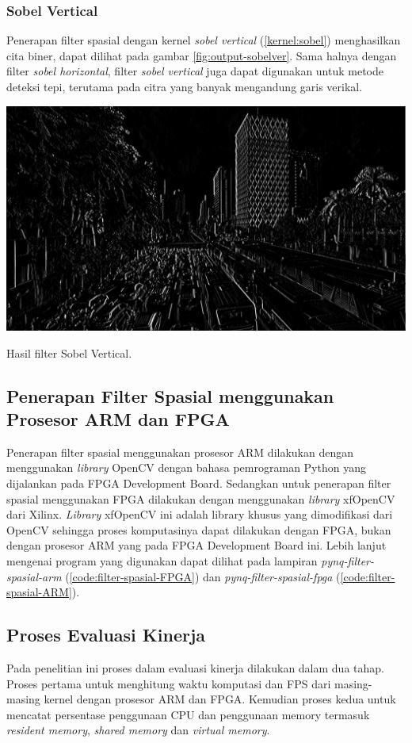 \subsubsection{Sobel Vertical}
Penerapan filter spasial dengan kernel \textit{sobel vertical} (\ref{kernel:sobel}) menghasilkan cita biner, dapat dilihat pada gambar \ref{fig:output-sobelver}. Sama halnya dengan filter \textit{sobel horizontal}, filter \textit{sobel vertical} juga dapat digunakan untuk metode deteksi tepi, terutama pada citra yang banyak mengandung garis verikal.
\begin{afigure}
    \includegraphics[width=0.8\linewidth, center]{images/output-image/input1-sobelver.png}
    \caption{Hasil filter Sobel Vertical.}
    \label{fig:output-sobelver}
\end{afigure}

\subsection{Penerapan Filter Spasial menggunakan Prosesor ARM dan FPGA}
Penerapan filter spasial menggunakan prosesor ARM dilakukan dengan menggunakan \textit{library} OpenCV dengan bahasa pemrograman Python yang dijalankan pada FPGA Development Board. Sedangkan untuk penerapan filter spasial menggunakan FPGA dilakukan dengan menggunakan \textit{library} xfOpenCV dari Xilinx. \textit{Library} xfOpenCV ini adalah library khusus yang dimodifikasi dari OpenCV sehingga proses komputasinya dapat dilakukan dengan FPGA, bukan dengan prosesor ARM yang pada FPGA Development Board ini. Lebih lanjut mengenai program yang digunakan dapat dilihat pada lampiran \textit{pynq-filter-spasial-arm} (\ref{code:filter-spasial-FPGA}) dan \textit{pynq-filter-spasial-fpga} (\ref{code:filter-spasial-ARM}).

\subsection{Proses Evaluasi Kinerja}
Pada penelitian ini proses dalam evaluasi kinerja dilakukan dalam dua tahap. Proses pertama untuk menghitung waktu komputasi dan FPS dari masing-masing kernel dengan prosesor ARM dan FPGA. Kemudian proses kedua untuk mencatat persentase penggunaan CPU dan penggunaan memory termasuk \textit{resident memory}, \textit{shared memory} dan \textit{virtual memory}. 

